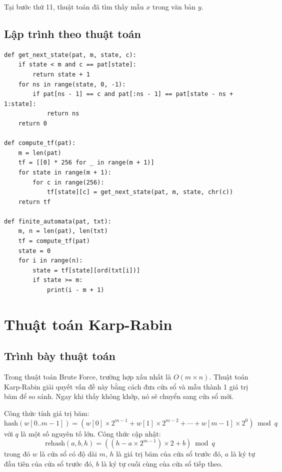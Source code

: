 \documentclass[12pt,twoside,openright]{extreport}
\begin{document}
Tại bước thứ 11, thuật toán đã tìm thấy mẫu $x$ trong văn bản $y$.

\subsection{Lập trình theo thuật toán}

\begin{lstlisting}[style=PythonStyle]
def get_next_state(pat, m, state, c):
    if state < m and c == pat[state]:
        return state + 1
    for ns in range(state, 0, -1):
        if pat[ns - 1] == c and pat[:ns - 1] == pat[state - ns + 1:state]:
            return ns
    return 0

def compute_tf(pat):
    m = len(pat)
    tf = [[0] * 256 for _ in range(m + 1)]
    for state in range(m + 1):
        for c in range(256):
            tf[state][c] = get_next_state(pat, m, state, chr(c))
    return tf

def finite_automata(pat, txt):
    m, n = len(pat), len(txt)
    tf = compute_tf(pat)
    state = 0
    for i in range(n):
        state = tf[state][ord(txt[i])]
        if state >= m:
            print(i - m + 1)
\end{lstlisting}

\section{Thuật toán Karp-Rabin}

\subsection{Trình bày thuật toán}

Trong thuật toán Brute Force, trường hợp xấu nhất là $O(m \times n)$. Thuật toán Karp-Rabin giải quyết vấn đề này bằng cách đưa cửa sổ và mẫu thành 1 giá trị băm để so sánh. Ngay khi thấy không khớp, nó sẽ chuyển sang cửa sổ mới.

Công thức tính giá trị băm:
\[
\text{hash}(w[0..m-1]) = (w[0] \times 2^{m-1} + w[1] \times 2^{m-2} + \cdots + w[m-1] \times 2^0) \bmod q
\]
với $q$ là một số nguyên tố lớn. Công thức cập nhật:
\[
\text{rehash}(a, b, h) = ((h - a \times 2^{m-1}) \times 2 + b) \bmod q
\]
trong đó $w$ là cửa sổ có độ dài $m$, $h$ là giá trị băm của cửa sổ trước đó, $a$ là ký tự đầu tiên của cửa sổ trước đó, $b$ là ký tự cuối cùng của cửa sổ tiếp theo.
\end{document}
